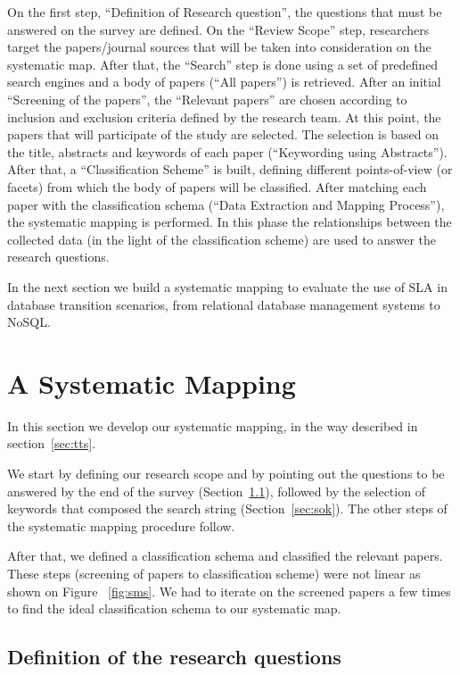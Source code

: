 \documentclass[conference, 10pt, a4paper]{IEEEtran}
\begin{document}
On the first step, ``Definition of Research question'', the questions that must be answered on the survey are defined. 
On the ``Review Scope'' step, researchers target the papers/journal sources that will be taken into consideration on the systematic map. 
After that, the ``Search'' step is done using a set of predefined search engines and a body of papers (``All papers'') is retrieved. 
After an initial ``Screening of the papers'', the ``Relevant papers'' are chosen according to inclusion and exclusion criteria defined by the research team. 
At this point, the papers that will participate of the study are selected. 
The selection is based on the title, abstracts and keywords of each paper (``Keywording using Abstracts'').
After that, a ``Classification Scheme'' is built, defining different points-of-view (or facets) from which the body of papers will be classified. 
After matching each paper with the classification schema (``Data Extraction and Mapping Process''), the  systematic mapping is performed.
In this phase the relationships between the collected data (in the light of the classification scheme) are used to answer the research questions.


In the next section we build a systematic mapping to evaluate the use of SLA in database transition scenarios, from relational database management systems to NoSQL.


\section{A Systematic Mapping}
\label{sec:asm}

In this section we develop our systematic mapping, in the way described in section~\ref{sec:tts}.

We start by defining our research scope and by pointing out the questions to be answered by the end of the survey (Section~\ref{sec:drq}), followed by the selection of keywords that composed the search string (Section~\ref{sec:sok}).
The other steps of the systematic mapping procedure follow.

After that, we defined a classification schema and classified the relevant papers. These steps (screening of papers to classification scheme) were not linear as shown on Figure ~\ref{fig:sms}. We had to iterate on the screened papers a few times to find the ideal classification schema to our systematic map.

\subsection{Definition of the research questions}
\label{sec:drq}
\end{document}
